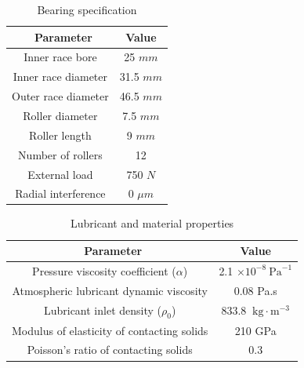\begin{table}
	\caption{Bearing specification}
	\label{Bearing Specification}
	\centering
	\renewcommand{\arraystretch}{1.5}%
	\begin{tabular}{|c|c|}
		\hline
		\ \textbf{Parameter} & \textbf{Value} \\ [0.5ex]
		\hline
		Inner race bore & 25 $mm$ \\ [0.5ex]
		\hline
		Inner race diameter & 31.5 $mm$ \\ [0.5ex]
		\hline
		Outer race diameter & 46.5 $mm$ \\ [0.5ex]
		\hline
		Roller diameter & 7.5 $mm$ \\ [0.5ex]
		\hline
		Roller length & 9 $mm$ \\ [0.5ex]
		\hline
		Number of rollers & 12 \\ [0.5ex]
		\hline
		External load & 750 $N$ \\ [0.5ex]
		\hline
		Radial interference & 0 $\mu m$ \\ [0.5ex]
		\hline
	\end{tabular}
\end{table}

\begin{table}
	\caption{Lubricant and material properties}
	\label{Lubricant and Material Properties}
	\centering
	\renewcommand{\arraystretch}{1.5}%
	\begin{tabular}{|c|c|}
		\hline
		\ \textbf{Parameter} & \textbf{Value} \\ [0.5ex]
		\hline
		Pressure viscosity coefficient ($\alpha$) & 2.1 $\times 10^{-8}\mathrm{~Pa}^{-1}$ \\ [0.5ex]
		\hline
		Atmospheric lubricant dynamic viscosity & 0.08 Pa.s \\ [0.5ex]
		\hline
		Lubricant inlet density ($\rho_0$) & 833.8 $\mathrm{~kg}\cdot\mathrm{m}^{-3}$ \\ [0.5ex]
		\hline
		Modulus of elasticity of contacting solids & 210 GPa \\ [0.5ex]
		\hline
		Poisson’s ratio of contacting solids & 0.3 \\ [0.5ex]
		\hline
	\end{tabular}
\end{table}

